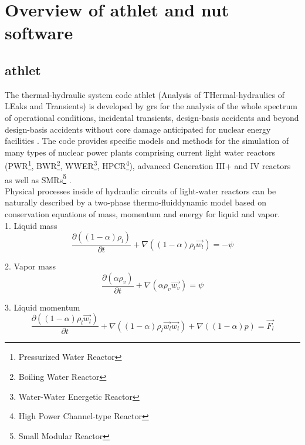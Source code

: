 \chapter{Overview of \gls{athlet} and \gls{nut} software}\label{chapter:athlet-nut}

\section{\gls{athlet}}
\label{sec:athlet-overview}


The thermal-hydraulic system code \acrshort{athlet} (Analysis of THermal-hydraulics of LEaks and Transients) is developed by \acrshort{grs} for the analysis of the whole spectrum of operational conditions, incidental transients, design-basis accidents and beyond design-basis accidents without core damage anticipated for nuclear energy facilities \cite{grs:athlet-info}. The code provides specific models and methods for the simulation of many types of nuclear power plants comprising current light water reactors (PWR\footnote{Pressurized Water Reactor}, BWR\footnote{Boiling Water Reactor}, WWER\footnote{Water-Water Energetic Reactor}, HPCR\footnote{High Power Channel-type Reactor}), advanced Generation III+ and IV reactors as well as SMRs\footnote{Small Modular Reactor} \cite{grs:athlet-info}.\\


Physical processes inside of hydraulic circuits of light-water reactors can be naturally described by a two-phase thermo-fluiddynamic model based on conservation equations of mass, momentum and energy for liquid and vapor.\\

1. Liquid mass
\begin{equation} \label{eq:athlet-1}
\frac{\partial ((1-\alpha)\rho_{l})}{\partial t} + \nabla ((1-\alpha) \rho_{l} \vec{w_{l}}) = - \psi
\end{equation}


2. Vapor mass
\begin{equation} \label{eq:athlet-2}
\frac{\partial (\alpha \rho_{v})}{\partial t} + \nabla (\alpha \rho_{v} \vec{w_{v}}) = \psi
\end{equation}


3. Liquid momentum
\begin{equation} \label{eq:athlet-3}
\frac{\partial ((1-\alpha) \rho_{l} \vec{w_{l}})}{\partial t} + \nabla ((1-\alpha) \rho_{l} \vec{w_{l}} \vec{w_{l}}) + \nabla ((1 - \alpha)p) = \vec{F_{l}}
\end{equation}


